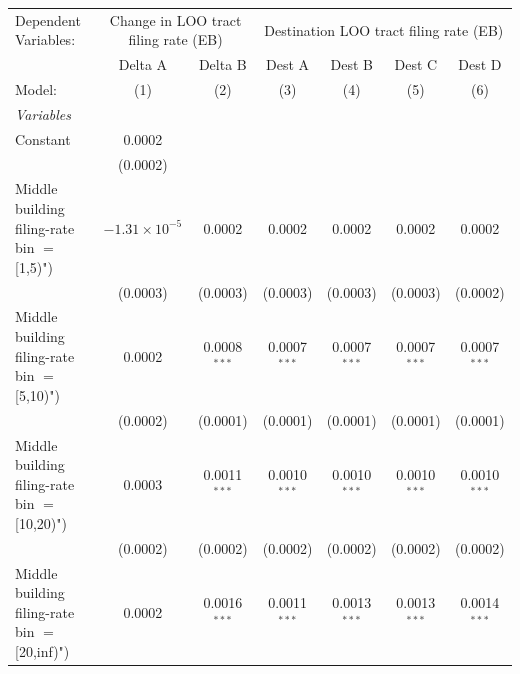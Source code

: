 \begingroup
\centering
\begin{tabular}{lcccccc}
   \tabularnewline \midrule \midrule
   Dependent Variables: & \multicolumn{2}{c}{Change in LOO tract filing rate (EB)} & \multicolumn{4}{c}{Destination LOO tract filing rate (EB)}\\
                                                  & Delta A                & Delta B        & Dest A         & Dest B         & Dest C                & Dest D \\   
   Model:                                         & (1)                    & (2)            & (3)            & (4)            & (5)                   & (6)\\  
   \midrule
   \emph{Variables}\\
   Constant                                       & 0.0002                 &                &                &                &                       &   \\   
                                                  & (0.0002)               &                &                &                &                       &   \\   
   Middle building filing-rate bin $=$ [1,5)")    & $-1.31\times 10^{-5}$  & 0.0002         & 0.0002         & 0.0002         & 0.0002                & 0.0002\\   
                                                  & (0.0003)               & (0.0003)       & (0.0003)       & (0.0003)       & (0.0003)              & (0.0002)\\   
   Middle building filing-rate bin $=$ [5,10)")   & 0.0002                 & 0.0008$^{***}$ & 0.0007$^{***}$ & 0.0007$^{***}$ & 0.0007$^{***}$        & 0.0007$^{***}$\\   
                                                  & (0.0002)               & (0.0001)       & (0.0001)       & (0.0001)       & (0.0001)              & (0.0001)\\   
   Middle building filing-rate bin $=$ [10,20)")  & 0.0003                 & 0.0011$^{***}$ & 0.0010$^{***}$ & 0.0010$^{***}$ & 0.0010$^{***}$        & 0.0010$^{***}$\\   
                                                  & (0.0002)               & (0.0002)       & (0.0002)       & (0.0002)       & (0.0002)              & (0.0002)\\   
   Middle building filing-rate bin $=$ [20,inf)") & 0.0002                 & 0.0016$^{***}$ & 0.0011$^{***}$ & 0.0013$^{***}$ & 0.0013$^{***}$        & 0.0014$^{***}$\\   

\end{tabular}
